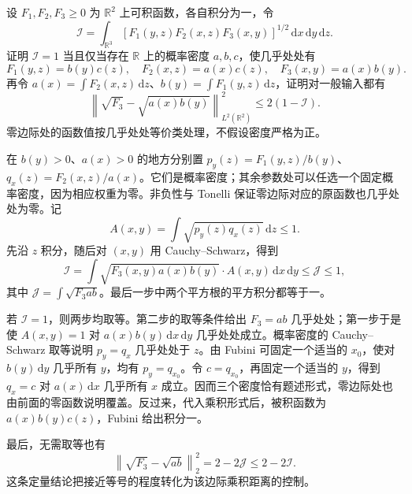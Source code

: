 \begin{optionalexercise}\label{b2:ex:25-new-2}
设 \(F_1,F_2,F_3\geq0\) 为 \(\mathbb R^2\) 上可积函数，各自积分为一，令
\[
 \mathcal I=\int_{\mathbb R^3}
       [F_1(y,z)F_2(x,z)F_3(x,y)]^{1/2}\,\mathrm dx\,\mathrm dy\,\mathrm dz.
\]
证明 \(\mathcal I=1\) 当且仅当存在 \(\mathbb R\) 上的概率密度 \(a,b,c\)，使几乎处处有
\[
 F_1(y,z)=b(y)c(z),
 \quad F_2(x,z)=a(x)c(z),
 \quad F_3(x,y)=a(x)b(y).
\]
再令 \(a(x)=\int F_2(x,z)\,\mathrm dz\)、\(b(y)=\int F_1(y,z)\,\mathrm dz\)，证明对一般输入都有
\[
 \left\|\sqrt{F_3}-\sqrt{a(x)b(y)}\right\|_{L^2(\mathbb R^2)}^2
       \leq2(1-\mathcal I).
\]
零边际处的函数值按几乎处处等价类处理，不假设密度严格为正。
\end{optionalexercise}
\begin{solution}
在 \(b(y)>0\)、\(a(x)>0\) 的地方分别置
\(p_y(z)=F_1(y,z)/b(y)\)、\(q_x(z)=F_2(x,z)/a(x)\)。它们是概率密度；其余参数处可以任选一个固定概率密度，因为相应权重为零。非负性与 Tonelli 保证零边际对应的原函数也几乎处处为零。记
\[
 A(x,y)=\int\sqrt{p_y(z)q_x(z)}\,\mathrm dz\leq1.
\]
先沿 \(z\) 积分，随后对 \((x,y)\) 用 Cauchy--Schwarz，得到
\[
 \mathcal I=\int\sqrt{F_3(x,y)a(x)b(y)}\cdot A(x,y)\,\mathrm dx\,\mathrm dy
 \leq\mathcal J\leq1,
\]
其中 \(\mathcal J=\int\sqrt{F_3ab}\)。最后一步中两个平方根的平方积分都等于一。

若 \(\mathcal I=1\)，则两步均取等。第二步的取等条件给出 \(F_3=ab\) 几乎处处；第一步于是使 \(A(x,y)=1\) 对 \(a(x)b(y)\,\mathrm dx\,\mathrm dy\) 几乎处处成立。概率密度的 Cauchy--Schwarz 取等说明 \(p_y=q_x\) 几乎处处于 \(z\)。由 Fubini 可固定一个适当的 \(x_0\)，使对 \(b(y)\,\mathrm dy\) 几乎所有 \(y\)，均有 \(p_y=q_{x_0}\)。令 \(c=q_{x_0}\)，再固定一个适当的 \(y\)，得到 \(q_x=c\) 对 \(a(x)\,\mathrm dx\) 几乎所有 \(x\) 成立。因而三个密度恰有题述形式，零边际处也由前面的零函数说明覆盖。反过来，代入乘积形式后，被积函数为 \(a(x)b(y)c(z)\)，Fubini 给出积分一。

最后，无需取等也有
\[
 \left\|\sqrt{F_3}-\sqrt{ab}\right\|_2^2
       =2-2\mathcal J\leq2-2\mathcal I.
\]
这条定量结论把接近等号的程度转化为该边际乘积距离的控制。
\end{solution}

